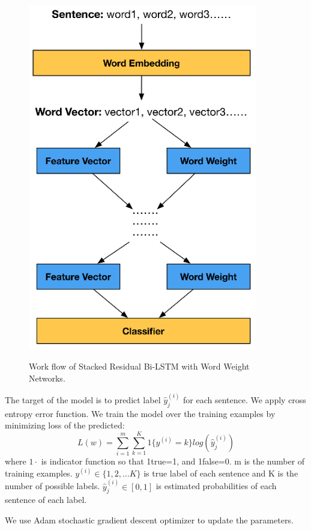 \documentclass[senior]{IPSstyle}
\begin{document}
\begin{figure}[t]
  \centering
  \includegraphics[width=10cm]{workflow.png}\\
  \caption{Work flow of Stacked Residual Bi-LSTM with Word Weight Networks.}\label{NBde}
\end{figure}



The target of the model is to predict label $\hat{y}_j^{(i)}$ for each sentence. We apply cross entropy error function. We train the model over the training examples by minimizing loss of the predicted:
\begin{equation}
L(w) =  \sum_{i=1}^m\sum_{k=1}^K1\{y^{(i)}=k\}log(\hat{y}_j^{(i)})
\end{equation}
where $1{\cdot}$ is indicator function so that 1{true}=1, and 1{false}=0. m is the number of training examples. $y^{(i)}\in \{1,2,\dots K\}$ is true label of each sentence and K is the number of possible labels. $\hat{y}_j^{(i)}\in [0,1]$ is estimated probabilities of each sentence of each label.
	
We use Adam\cite{kingma2014adam} stochastic gradient descent optimizer to update the parameters.
\end{document}
